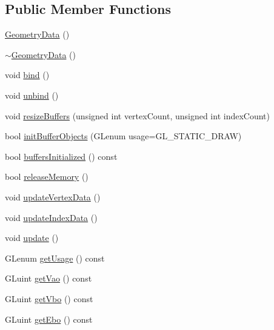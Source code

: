 \subsection*{Public Member Functions}
\begin{DoxyCompactItemize}
\item 
\mbox{\hyperlink{classec_1_1_geometry_data_a21db28a4c6d964c8bc59cc698170e77c}{Geometry\+Data}} ()
\item 
\mbox{\hyperlink{classec_1_1_geometry_data_ab0684d232286015d10fb40ab49836c84}{$\sim$\+Geometry\+Data}} ()
\item 
void \mbox{\hyperlink{classec_1_1_geometry_data_acb50971e6fbd928172731a3427d22691}{bind}} ()
\item 
void \mbox{\hyperlink{classec_1_1_geometry_data_abb54af4b2922eb16973b450d6cf0beae}{unbind}} ()
\item 
void \mbox{\hyperlink{classec_1_1_geometry_data_a85ce34e18732d88632310d751a6c2cee}{resize\+Buffers}} (unsigned int vertex\+Count, unsigned int index\+Count)
\item 
bool \mbox{\hyperlink{classec_1_1_geometry_data_ade0586602da2a8917fe55b592ff44a57}{init\+Buffer\+Objects}} (G\+Lenum usage=G\+L\+\_\+\+S\+T\+A\+T\+I\+C\+\_\+\+D\+R\+AW)
\item 
bool \mbox{\hyperlink{classec_1_1_geometry_data_a23c0090061b5b21b74f070916915ca69}{buffers\+Initialized}} () const
\item 
bool \mbox{\hyperlink{classec_1_1_geometry_data_a5df7921c489c60d96a971003c299dcb3}{release\+Memory}} ()
\item 
void \mbox{\hyperlink{classec_1_1_geometry_data_aeb93c2e5bd5f4656eaa12651cd4927aa}{update\+Vertex\+Data}} ()
\item 
void \mbox{\hyperlink{classec_1_1_geometry_data_a23fd4a2619691fb7bbd5c0650544cce3}{update\+Index\+Data}} ()
\item 
void \mbox{\hyperlink{classec_1_1_geometry_data_ad8edfa8a7fda52850f072ab845ef38fd}{update}} ()
\item 
G\+Lenum \mbox{\hyperlink{classec_1_1_geometry_data_a237459076c98af454bfc3624eebedc81}{get\+Usage}} () const
\item 
G\+Luint \mbox{\hyperlink{classec_1_1_geometry_data_abc8d74fcacf693aad19683387adcfadf}{get\+Vao}} () const
\item 
G\+Luint \mbox{\hyperlink{classec_1_1_geometry_data_a067f9cd54e35a1faff1c5011a542eed8}{get\+Vbo}} () const
\item 
G\+Luint \mbox{\hyperlink{classec_1_1_geometry_data_ae3f427f933c595b169bd10551d52abc3}{get\+Ebo}} () const
\end{DoxyCompactItemize}

